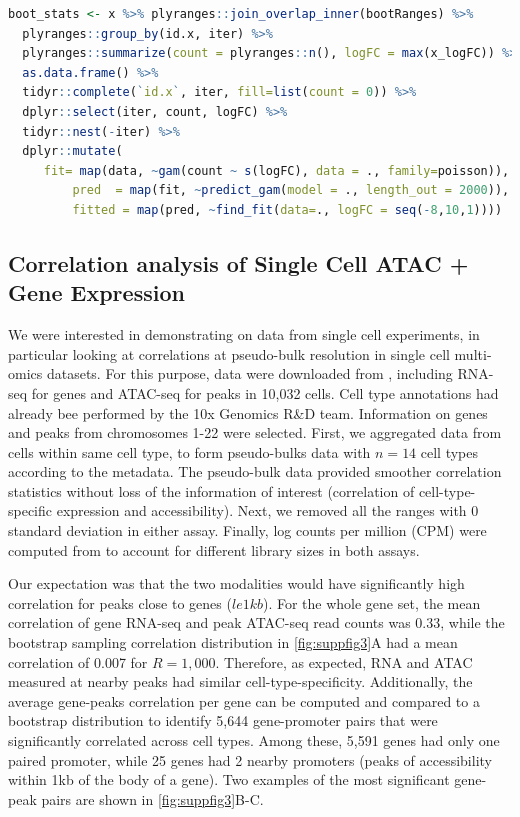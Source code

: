 \documentclass{article}
\begin{document}
\begin{lstlisting}[language=R]
boot_stats <- x %>% plyranges::join_overlap_inner(bootRanges) %>%
  plyranges::group_by(id.x, iter) %>%
  plyranges::summarize(count = plyranges::n(), logFC = max(x_logFC)) %>%
  as.data.frame() %>%
  tidyr::complete(`id.x`, iter, fill=list(count = 0)) %>%
  dplyr::select(iter, count, logFC) %>%
  tidyr::nest(-iter) %>%
  dplyr::mutate(
	 fit= map(data, ~gam(count ~ s(logFC), data = ., family=poisson)),
         pred  = map(fit, ~predict_gam(model = ., length_out = 2000)),
         fitted = map(pred, ~find_fit(data=., logFC = seq(-8,10,1))))

\end{lstlisting} 

\pagebreak

\subsection{Correlation analysis of Single Cell ATAC + Gene Expression}

We were interested in demonstrating \bootranges on data from single
cell experiments, in particular looking at correlations at
pseudo-bulk resolution in single cell multi-omics datasets.
For this purpose, 
data were downloaded from \citet{Vignette}, including
RNA-seq for genes and ATAC-seq for peaks in 10,032 cells.
Cell type annotations had already bee performed
by the 10x Genomics R\&D team. Information on genes and peaks from
chromosomes 1-22 were selected.
First, we aggregated data from cells within same cell type, to form
pseudo-bulks data with $n=14$ cell types according to the metadata. 
The pseudo-bulk data provided smoother correlation statistics without
loss of the information of interest (correlation of cell-type-specific
expression and accessibility).
Next, we removed all the ranges with 0
standard deviation in either assay.
Finally, log counts per million (CPM) were computed
from  \citep{edgeR2010Robinson} to account for different library sizes
in both assays.

Our expectation was that the two modalities would have
significantly high correlation for peaks close to genes ($le 1kb$).
For the whole gene set, the mean
correlation of gene RNA-seq and peak ATAC-seq read counts was 0.33, while the
bootstrap sampling correlation distribution in \cref{fig:suppfig3}A
had a mean correlation of 0.007 for $R = 1,000$.
Therefore, as expected, RNA and ATAC
measured at nearby peaks had similar cell-type-specificity.
Additionally, the average gene-peaks correlation per gene can be
computed and compared to a bootstrap distribution to identify 5,644
gene-promoter pairs that were significantly correlated across cell
types. Among these, 5,591 genes had only one paired promoter, while 25
genes had 2 nearby promoters (peaks of accessibility within 1kb of the
body of a gene). 
Two examples of the most significant gene-peak pairs are shown in
\cref{fig:suppfig3}B-C.
\end{document}

